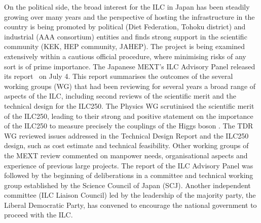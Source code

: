 \documentclass[%
 reprint,
 amsmath,amssymb,
 aps,
]{revtex4-1}
\newcommand{\todo}[1]{\textcolor{red}{{#1}}}
\begin{document}
On the political side, the broad interest for the ILC in Japan has been steadily growing over many years and the perspective of hosting the infrastructure in the country is being promoted by political (Diet Federation, Tohoku district) and industrial (AAA consortium) entities and finds strong support in the scientific community (KEK, HEP community, JAHEP). The project is being examined extensively within a cautious official procedure, where minimising risks of any sort is of prime importance. The Japanese MEXT's ILC Advisory Panel released its report~\cite{AdvPanel} on July 4.  This report summarises the outcomes of the several working groups (WG) that had been reviewing for several years a broad range of aspects of the ILC, including second reviews of the scientific merit and the technical design for the ILC250. 
The  Physics WG scrutinised the scientific merit of the ILC250, leading to their strong and positive statement on the importance of the ILC250 to measure precisely the couplings of the Higgs boson \cite{AdvPanel}.
The TDR WG reviewed issues addressed in the Technical Design Report and the ILC250 design, such as cost estimate and technical feasibility.  
Other working groups of the MEXT review commented on manpower needs, organisational aspects and experience of previous large projects.
The report of the ILC Advisory Panel was followed by the beginning of deliberations in a committee and technical working group established by the Science Council of Japan (SCJ).  Another independent committee (ILC Liaison Council) led by the leadership of the majority party, the Liberal Democratic Party, has convened to encourage the national government to proceed with the ILC.

\end{document}
